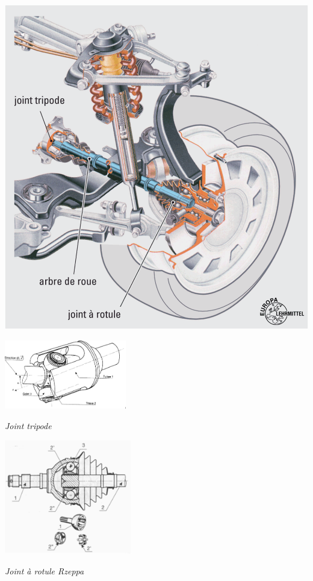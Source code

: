 \documentclass[11pt,oneside]{article}
\begin{document}
\begin{minipage}[c]{.5\linewidth}
\begin{center}
\includegraphics[width=.9\textwidth]{png/fig_37}
\end{center}
\end{minipage} \hfill
\begin{minipage}[c]{.45\linewidth}
\begin{center}
\includegraphics[height=3cm]{png/fig_38}

\textit{Joint tripode}

\includegraphics[height=5cm]{png/fig_39}

\textit{Joint à rotule Rzeppa}

\end{center}
\end{minipage} 
\end{document}
